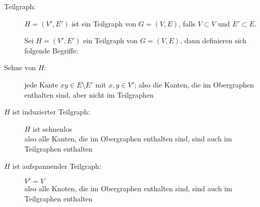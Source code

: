 \documentclass[%
a4paper, %
9pt,              %
leqno,            %
fleqn,            %
]
{scrartcl}
\begin{document}
\begin{description}
  \item[Teilgraph:] $H = (V', E')$ ist ein Teilgraph von $G = (V,E)$, falls $V
    \subset V$ und $E' \subset E$.

  Sei $H = (V', E')$ ein Teilgraph von $G = (V,E)$, dann definieren sich
  folgende Begriffe:

  \item[Sehne von $H$:] jede Kante $xy \in E \setminus E'$ mit $x,y \in V'$;
    also die Kanten, die im Obergraphen enthalten sind, aber nicht im Teilgraphen
  \item[$H$ ist induzierter Teilgraph:] $H$ ist sehnenlos\\
    also alle Kanten, die im Obergraphen enthalten sind, sind auch im
    Teilgraphen enthalten
  \item[$H$ ist aufspannender Teilgraph:] $V' = V$\\
    also alle Knoten, die im Obergraphen enthalten sind, sind auch im
    Teilgraphen enthalten


\end{description}
\end{document}
